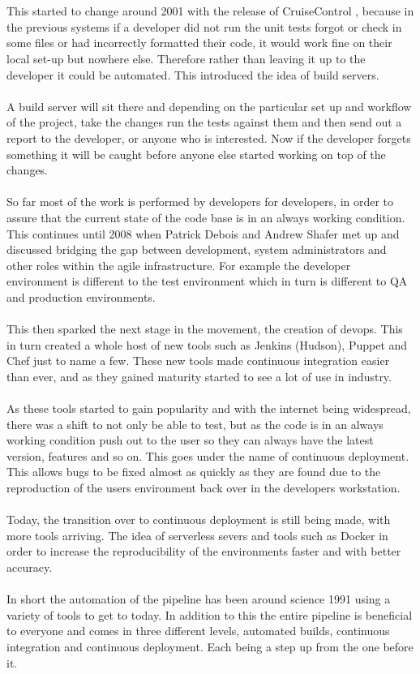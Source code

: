 \\\\
This started to change around 2001 with the release of CruiseControl \citep{cc}, because in the previous systems if a developer did not run the unit tests forgot or check in some files or had incorrectly formatted their code,  it would work fine on their local set-up but nowhere else. Therefore rather than leaving it up to the developer it could be automated. This introduced the idea of build servers. 
\\\\
A build server will sit there and depending on the particular set up and workflow of the project, take the changes run the tests against them and then send out a report to the developer, or anyone who is interested. Now if the developer forgets something it will be caught before anyone else started working on top of the changes.
\\\\
So far most of the work is performed by developers for developers, in order to assure that the current state of the code base is in an always working condition. This continues until 2008 when Patrick Debois and Andrew Shafer met up and discussed bridging the gap between development, system administrators and other roles within the agile infrastructure. For example the developer environment is different to the test environment which in turn is different to QA and production environments. 
\\\\
This then sparked the next stage in the movement, the creation of devops. This in turn created a whole host of new tools such as Jenkins (Hudson), Puppet and Chef just to name a few. These new tools made continuous integration easier than ever, and as they gained maturity started to see a lot of use in industry. \citep{devop_history}
\\\\
As these tools started to gain popularity and with the internet being widespread, there was a shift to not only be able to test, but as the code is in an always working condition push out to the user so they can always have the latest version, features and so on. This goes under the name of continuous deployment. This allows bugs to be fixed almost as quickly as they are found due to the reproduction of the users environment back over in the developers workstation.
\\\\
Today, the transition over to continuous deployment is still being made, with more tools arriving. The idea of serverless severs and tools such as Docker in order to increase the reproducibility of the environments faster and with better accuracy.
\\\\
In short the automation of the pipeline has been around science 1991 using a variety of tools to get to today. In addition to this the entire pipeline is beneficial to everyone and comes in three different levels, automated builds, continuous integration and continuous deployment. Each being a step up from the one before it. 

